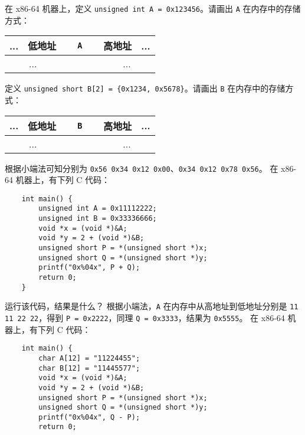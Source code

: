 	\begin{problems}
		\pro 在 x86-64 机器上，定义 \texttt{unsigned int A = 0x123456}。请画出 \texttt{A} 在内存中的存储方式：
		\begin{table}[H]
			\centering
			\begin{tabular}{|c|c|c|c|c|c|c|c|}
				\hline
				... & 低地址 & \multicolumn{4}{c|}{\texttt{A}} & 高地址 & ... \\ \hline
				\multicolumn{2}{|c|}{...} & {\qquad \qquad} & {\qquad \qquad} & {\qquad \qquad} & {\qquad \qquad} & \multicolumn{2}{c|}{...} \\ \hline
			\end{tabular}
		\end{table}
		定义 \texttt{unsigned short B[2] = \{0x1234, 0x5678\}}。请画出 \texttt{B} 在内存中的存储方式：
		\begin{table}[H]
			\centering
			\begin{tabular}{|c|c|c|c|c|c|c|c|}
				\hline
				... & 低地址 & \multicolumn{4}{c|}{\texttt{B}} & 高地址 & ... \\ \hline
				\multicolumn{2}{|c|}{...} & {\qquad \qquad} & {\qquad \qquad} & {\qquad \qquad} & {\qquad \qquad} & \multicolumn{2}{c|}{...} \\ \hline
			\end{tabular}
		\end{table}
		\sol 根据小端法可知分别为 \verb|0x56 0x34 0x12 0x00|、\verb|0x34 0x12 0x78 0x56|。
		\pro 在 x86-64 机器上，有下列 C 代码：
		\begin{verbatim}
    int main() {
        unsigned int A = 0x11112222;
        unsigned int B = 0x33336666;
        void *x = (void *)&A;
        void *y = 2 + (void *)&B;
        unsigned short P = *(unsigned short *)x;
        unsigned short Q = *(unsigned short *)y;
        printf("0x%04x", P + Q);
        return 0;
    }
		\end{verbatim}
		运行该代码，结果是什么？
		\sol 根据小端法，\verb|A| 在内存中从高地址到低地址分别是 \verb|11 11 22 22|，得到 \verb|P = 0x2222|，同理 \verb|Q = 0x3333|，结果为 \verb|0x5555|。
		\pro 在 x86-64 机器上，有下列 C 代码：
		\begin{verbatim}
    int main() {
        char A[12] = "11224455";
        char B[12] = "11445577";
        void *x = (void *)&A;
        void *y = 2 + (void *)&B;
        unsigned short P = *(unsigned short *)x;
        unsigned short Q = *(unsigned short *)y;
        printf("0x%04x", Q - P);
        return 0;

\end{verbatim}
\end{problems}
